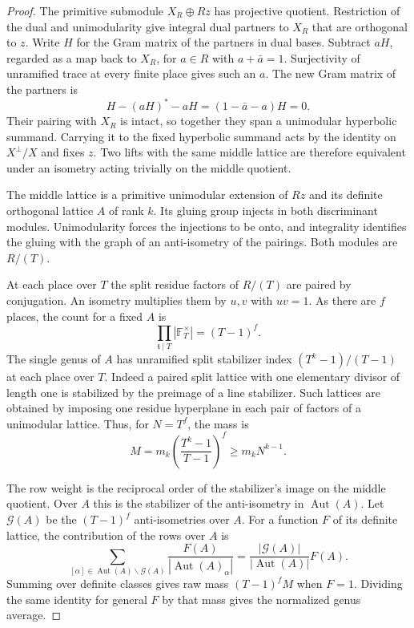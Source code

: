 \begin{proof}
The primitive submodule \(X_R\oplus Rz\) has projective
quotient. Restriction of the dual and unimodularity give
integral dual partners to \(X_R\) that are orthogonal to
\(z\). Write \(H\) for the Gram matrix of the partners in dual bases.
Subtract \(aH\), regarded as a map back to \(X_R\), for
\(a\in R\) with \(a+\bar a=1\). Surjectivity of unramified
trace at every finite place gives such an \(a\). The new Gram
matrix of the partners is
\[
 H-(aH)^*-aH=(1-\bar a-a)H=0 .
\]
Their pairing with \(X_R\) is intact, so together they span a
unimodular hyperbolic summand.
Carrying it to the fixed hyperbolic summand acts by the
identity on \(X^\perp/X\) and fixes \(z\). Two lifts with
the same middle lattice are therefore equivalent under
an isometry acting trivially on the middle quotient.


The middle lattice is a primitive unimodular extension
of \(Rz\) and its definite orthogonal lattice \(A\) of rank
\(k\). Its gluing group injects in both discriminant modules.
Unimodularity forces the injections to be onto, and
integrality identifies the gluing with the graph of an
anti-isometry of the pairings. Both modules are \(R/(T)\).

At each place over \(T\) the split residue factors of \(R/(T)\)
are paired by conjugation. An isometry multiplies them by \(u,v\)
with \(uv=1\). As there are \(f\) places, the count for a
fixed \(A\) is
\[
    \prod_{\mathfrak t\mid T}|\mathbb F_T^\times|=(T-1)^f .
\]
The single genus of \(A\) has unramified split stabilizer
index \((T^k-1)/(T-1)\) at each place over \(T\). Indeed a
paired split lattice with one elementary divisor of length
one is stabilized by the preimage of a line stabilizer.
Such lattices are obtained by imposing one residue hyperplane
in each pair of factors of a unimodular lattice. Thus, for
\(N=T^f\), the mass is
\[
 M=m_k\left(\frac{T^k-1}{T-1}\right)^f\geq m_kN^{k-1}.
\]

The row weight is the reciprocal order of the stabilizer's
image on the middle quotient. Over \(A\) this is the
stabilizer of the anti-isometry in \(\operatorname{Aut}(A)\).
Let \(\mathcal G(A)\) be the \((T-1)^f\) anti-isometries
over \(A\). For a function \(F\) of its definite lattice, the
contribution of the rows over \(A\) is
\[
 \sum_{[\alpha]\in\operatorname{Aut}(A)\backslash\mathcal G(A)}
        \frac{F(A)}{|\operatorname{Aut}(A)_\alpha|}
   =\frac{|\mathcal G(A)|}{|\operatorname{Aut}(A)|}F(A).
\]
Summing over definite classes gives raw mass \((T-1)^fM\)
when \(F=1\). Dividing the same identity for general \(F\) by
that mass gives the normalized genus average.

\end{proof}

